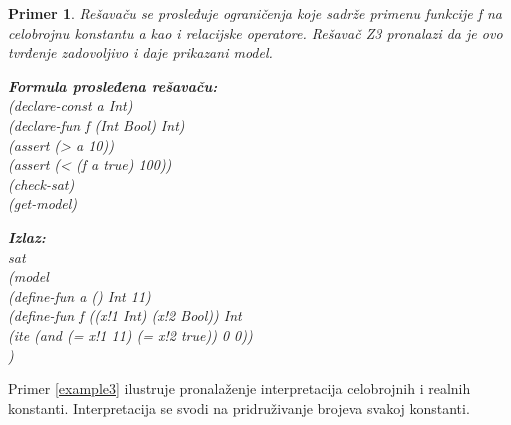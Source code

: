 \documentclass[12pt,oneside]{memoir}
\newcommand\tab[1][0.5cm]{\hspace*{#1}}
\newtheorem{primer}{Primer}
\begin{document}
\begin{primer} \label{example2} 
Rešavaču se prosleđuje ograničenja koje sadrže primenu funkcije f na celobrojnu konstantu a kao i relacijske operatore. Rešavač Z3 pronalazi da je ovo tvrđenje zadovoljivo i daje prikazani model. 
\\ 

\hspace{-0.7cm}
\begin{minipage}[b]{0.43\textwidth}
\textbf{Formula prosleđena rešavaču:}\\
(declare-const a Int)\\
(declare-fun f (Int Bool) Int)\\
(assert (> a 10))\\
(assert (< (f a true) 100))\\
(check-sat)\\
(get-model) \\
\end{minipage}
\hspace{0.6cm}
\begin{minipage}[t]{0.5\textwidth}
\vspace{-4.715cm}
\textbf{Izlaz:}
\\sat 
\\(model 
\\\tab(define-fun a () Int 11) 
\\\tab(define-fun f ((x!1 Int) (x!2 Bool)) Int 
\\\tab(ite (and (= x!1 11) (= x!2 true)) 0 0))
\\)
\end{minipage}
\end{primer}

Primer \ref{example3} ilustruje pronalaženje interpretacija celobrojnih i realnih konstanti. Interpretacija se svodi na pridruživanje brojeva svakoj konstanti. 
\end{document}
